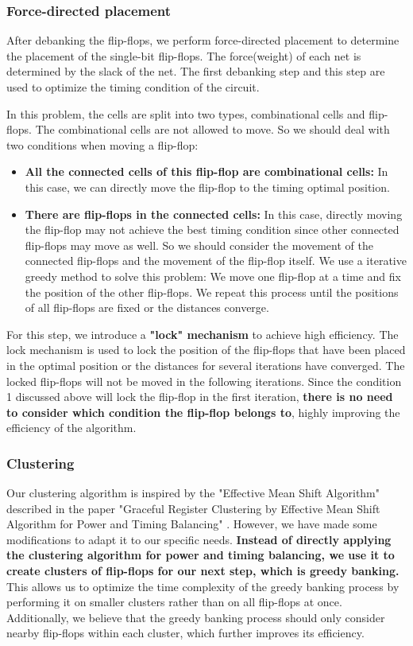 \documentclass[12pt]{article}
\begin{document}
\subsubsection{Force-directed placement}
After debanking the flip-flops, we perform force-directed placement to determine the placement of the single-bit flip-flops. The force(weight) of each net is determined by the slack of the net. The first debanking step and this step are used to optimize the timing condition of the circuit.

In this problem, the cells are split into two types, combinational cells and flip-flops. The combinational cells are not allowed to move. So we should deal with two conditions when moving a flip-flop:

\begin{itemize}
    \item \textbf{All the connected cells of this flip-flop are combinational cells:} In this case, we can directly move the flip-flop to the timing optimal position.
    \item \textbf{There are flip-flops in the connected cells:} In this case, directly moving the flip-flop may not achieve the best timing condition since other connected flip-flops may move as well. So we should consider the movement of the connected flip-flops and the movement of the flip-flop itself. We use a iterative greedy method to solve this problem: We move one flip-flop at a time and fix the position of the other flip-flops. We repeat this process until the positions of all flip-flops are fixed or the distances converge.
\end{itemize}

For this step, we introduce a \textbf{"lock" mechanism} to achieve high efficiency. The lock mechanism is used to lock the position of the flip-flops that have been placed in the optimal position or the distances for several iterations have converged. The locked flip-flops will not be moved in the following iterations. Since the condition 1 discussed above will lock the flip-flop in the first iteration, \textbf{there is no need to consider which condition the flip-flop belongs to}, highly improving the efficiency of the algorithm.

\subsubsection{Clustering}

Our clustering algorithm is inspired by the "Effective Mean Shift Algorithm" described in the paper "Graceful Register Clustering by Effective Mean Shift Algorithm for Power and Timing Balancing" \cite{jiang}. However, we have made some modifications to adapt it to our specific needs. \textbf{Instead of directly applying the clustering algorithm for power and timing balancing, we use it to create clusters of flip-flops for our next step, which is greedy banking.} This allows us to optimize the time complexity of the greedy banking process by performing it on smaller clusters rather than on all flip-flops at once. Additionally, we believe that the greedy banking process should only consider nearby flip-flops within each cluster, which further improves its efficiency.
\end{document}
